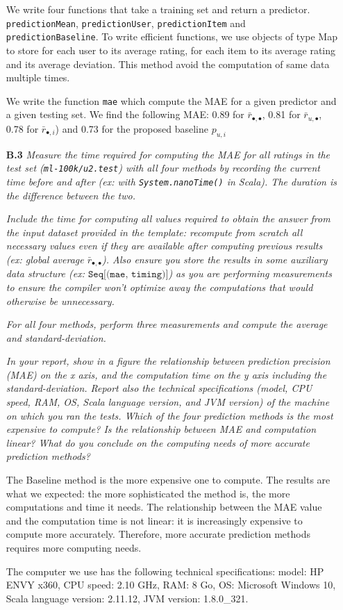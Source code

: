 \documentclass{article}
\begin{document}
\begin{itemize}
    We write four functions that take a training set and return a predictor. \texttt{predictionMean}, \texttt{predictionUser}, \texttt{predictionItem} and \texttt{predictionBaseline}. To write efficient functions, we use objects of type Map to store for each user to its average rating, for each item to its average rating and its average deviation. This method avoid the computation of same data multiple times. 
    
    We write the function \texttt{mae} which compute the MAE for a given predictor and a given testing set. We find the following MAE: 0.89 for $\bar r_{\bullet, \bullet}$, 0.81 for $\bar r_{u,\bullet}$, 0.78 for $\bar r_{\bullet,i}$) and 0.73 for the proposed baseline $p_{u,i}$

  \item [\textbf{B.3}] \textit{Measure the time required for computing the MAE for all ratings in the test set (\texttt{ml-100k/u2.test}) with all four methods by recording the current time before and after (ex: with \texttt{System.nanoTime()} in Scala). The duration is the difference between the two. } 
 
 \textit{ 
Include the time for computing all values required to obtain the answer from the input dataset provided in the template: recompute from scratch all necessary values even if they are available after computing previous results (ex: global average $\bar r_{\bullet, \bullet}$). Also ensure you store the results in some auxiliary data structure (ex: $\texttt{Seq[(mae, timing)]}$) as you are performing measurements to ensure the compiler won't optimize away the computations that would otherwise be unnecessary.}

\textit{
 For all four methods, perform three measurements and compute the average and standard-deviation.}
 
 \textit{In your report, show in a figure the relationship between prediction precision (MAE) on the x axis, and the computation time on the y axis including the standard-deviation. Report also the technical specifications (model, CPU speed, RAM, OS, Scala language version, and JVM version) of the machine on which you ran the tests. Which of the four prediction methods is the most expensive to compute? Is the relationship between MAE and computation linear? What do you conclude on the computing needs of more accurate prediction methods?}
 
 The Baseline method is the more expensive one to compute. The results are what we expected: the more sophisticated the method is, the more computations and time it needs. The relationship between the MAE value and the computation time is not linear: it is increasingly expensive to compute more accurately. Therefore, more accurate prediction methods requires more computing needs.
 
 The computer we use has the following technical specifications: model: HP ENVY x360, CPU speed: 2.10 GHz, RAM: 8 Go, OS: Microsoft Windows 10, Scala language version: 2.11.12,  JVM version: 1.8.0\_321.

\end{itemize}
\end{document}
